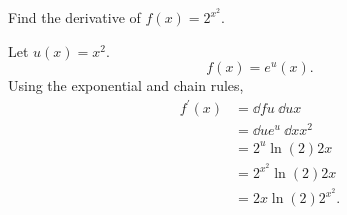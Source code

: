 \begin{example}
	Find the derivative of $f(x) = 2^{x^2}$.
\end{example}
\begin{answer}
	Let $u(x) = x^2$.
	\begin{equation*}
		f(x) = e^u(x).
	\end{equation*}
	Using the exponential and chain rules,
	\begin{align*}
		f^\prime(x) &= \dd{f}{u} \hspace{3pt} \dd{u}{x} \\
		&= \dd{}{u}e^u \hspace{3pt} \dd{}{x}x^2 \\
		&= 2^u \ln{(2)} 2x \\
		&= 2^{x^2} \ln{(2)} 2x \\
		&=  2x\ln{(2)}2^{x^2}.
	\end{align*}
\end{answer}